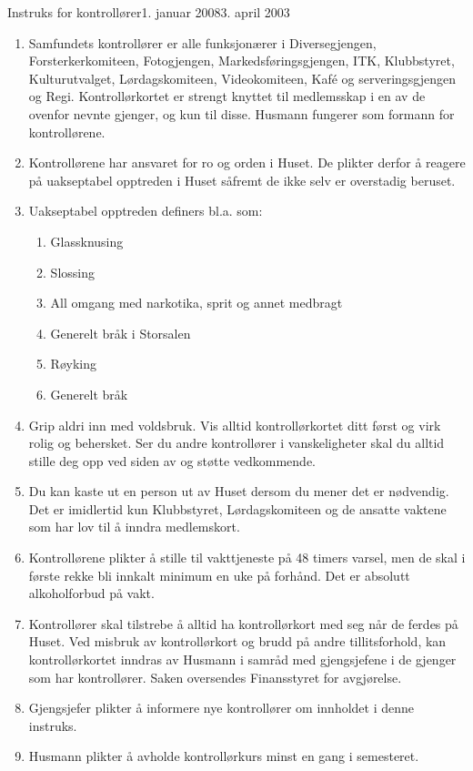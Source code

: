 \begin{instruks}{Instruks for kontrollører}{1. januar 2008}{3. april 2003}

    \begin{enumerate}
        \item Samfundets kontrollører er alle funksjonærer i Diversegjengen,
            Forsterkerkomiteen, Fotogjengen, Markedsføringsgjengen, ITK, 
Klubbstyret, Kulturutvalget, Lørdagskomiteen,
            Videokomiteen,
            Kaf\'e og serveringsgjengen og Regi. Kontrollørkortet er 
strengt knyttet til medlemsskap
            i en av de ovenfor nevnte gjenger,
            og kun til disse. Husmann fungerer som formann for kontrollørene.
        \item Kontrollørene har ansvaret for ro og orden i Huset. De plikter derfor å
            reagere på uakseptabel opptreden i
            Huset såfremt de ikke selv er overstadig beruset.
        \item Uakseptabel opptreden definers bl.a. som:
            \begin{enumerate}
                \item  Glassknusing
                \item  Slossing
                \item  All omgang med narkotika, sprit og annet medbragt
                \item  Generelt bråk i Storsalen
                \item  Røyking
                \item  Generelt bråk
            \end{enumerate}
        \item Grip aldri inn med voldsbruk. Vis alltid kontrollørkortet ditt først og virk
            rolig og behersket. Ser du andre
            kontrollører i vanskeligheter skal du alltid stille deg opp ved siden av og
            støtte vedkommende.
        \item Du kan kaste ut en person ut av Huset dersom du mener det er nødvendig. Det
            er imidlertid kun Klubbstyret,
            Lørdagskomiteen og de ansatte vaktene som har lov til å inndra medlemskort.
        \item Kontrollørene plikter å stille til vakttjeneste på 48 timers varsel, men de
            skal i første rekke bli innkalt
            minimum en uke på forhånd. Det er absolutt alkoholforbud på vakt.
        \item  Kontrollører skal tilstrebe å alltid ha kontrollørkort med seg når de
            ferdes på Huset. Ved misbruk av
            kontrollørkort og brudd på andre tillitsforhold, kan kontrollørkortet inndras
            av Husmann i samråd med
            gjengsjefene i de gjenger som har kontrollører. Saken oversendes Finansstyret
            for avgjørelse.
        \item Gjengsjefer plikter å informere nye kontrollører om innholdet i denne
            instruks.
        \item Husmann plikter å avholde kontrollørkurs minst en gang i semesteret.
    \end{enumerate}

\end{instruks}


